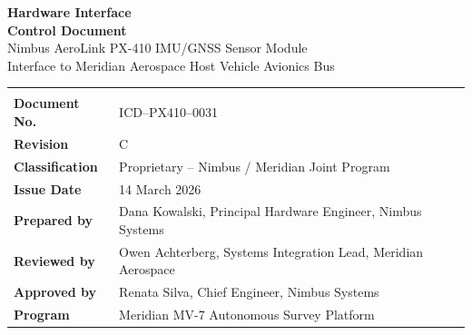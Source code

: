 \documentclass[11pt,a4paper]{scrreprt}
\begin{document}
\begin{titlepage}

\vspace*{3.0cm}

\begin{center}
{\sffamily\bfseries\Huge\color{icdnavy} Hardware Interface\\[2pt] Control Document}\\[10pt]
{\sffamily\Large\color{icdsteel} Nimbus AeroLink PX-410 IMU/GNSS Sensor Module}\\[4pt]
{\sffamily\large\color{icdsteel} Interface to Meridian Aerospace Host Vehicle Avionics Bus}
\end{center}

\vspace{1.6cm}
\begin{center}
\begin{tabularx}{0.86\textwidth}{@{}l Y@{}}
 \\
\textbf{Document No.} & ICD--PX410--0031 \\
\textbf{Revision} & C \\
\textbf{Classification} & Proprietary -- Nimbus / Meridian Joint Program \\
\textbf{Issue Date} & 14 March 2026 \\
\textbf{Prepared by} & Dana Kowalski, Principal Hardware Engineer, Nimbus Systems \\
\textbf{Reviewed by} & Owen Achterberg, Systems Integration Lead, Meridian Aerospace \\
\textbf{Approved by} & Renata Silva, Chief Engineer, Nimbus Systems \\
\textbf{Program} & Meridian MV-7 Autonomous Survey Platform \\
\end{tabularx}
\end{center}


\end{titlepage}
\end{document}
